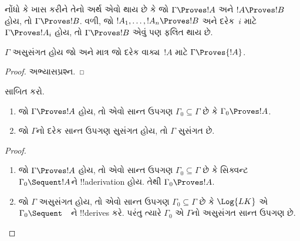 \documentclass[../../../include/open-logic-section]{subfiles}
\begin{document}
નોંધો કે ખાસ કરીને તેનો અર્થ એવો થાય છે કે જો $\Gamma \Proves !A$ અને
$!A \Proves !B$ હોય, તો $\Gamma \Proves !B$. વળી, જો
$!A_1, \dots, !A_n \Proves !B$ અને દરેક~$i$ માટે
$\Gamma \Proves !A_i$ હોય, તો $\Gamma \Proves !B$ એવું પણ ફલિત થાય છે.

\begin{prop}
$\Gamma$ અસુસંગત હોય જો અને માત્ર જો દરેક વાક્ય~$!A$ માટે
$\Gamma \Proves {!A}$.
\end{prop}

\begin{proof}
અભ્યાસપ્રશ્ન.
\end{proof}

\begin{prob}
 સાબિત કરો.
\end{prob}

\begin{prop}[સઘનતા]
  \begin{enumerate}
  \item જો $\Gamma \Proves !A$ હોય, તો એવો સાન્ત ઉપગણ
    $\Gamma_0 \subseteq \Gamma$ છે કે $\Gamma_0 \Proves !A$.
  \item જો $\Gamma$નો દરેક સાન્ત ઉપગણ સુસંગત હોય, તો $\Gamma$ સુસંગત છે.
  \end{enumerate}
\end{prop}

\begin{proof}
  \begin{enumerate}
    \item જો $\Gamma \Proves !A$ હોય, તો એવો સાન્ત ઉપગણ
      $\Gamma_0 \subseteq \Gamma$ છે કે સિક્વન્ટ
      $\Gamma_0 \Sequent !A$ને !!a{derivation} હોય. તેથી
      $\Gamma_0 \Proves !A$.
    \item જો $\Gamma$ અસુસંગત હોય, તો એવો સાન્ત ઉપગણ
      $\Gamma_0 \subseteq \Gamma$ છે કે $\Log{LK}$ એ
      $\Gamma_0 \Sequent \quad$ને !!{derive}s કરે. પરંતુ ત્યારે
      $\Gamma_0$ એ $\Gamma$નો અસુસંગત સાન્ત ઉપગણ છે.
  \end{enumerate}
\end{proof}
\end{document}
